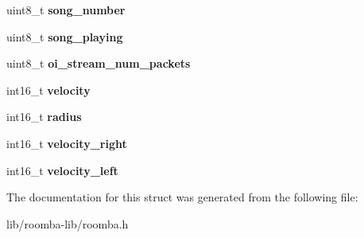 \begin{DoxyCompactItemize}
\item 
\hypertarget{group__roomba-lib_ga4555c6fbef8603704920f166b769c336}{}uint8\+\_\+t {\bfseries song\+\_\+number}\label{group__roomba-lib_ga4555c6fbef8603704920f166b769c336}

\item 
\hypertarget{group__roomba-lib_gad0ca49b2f11f06d401f9487315d87f3c}{}uint8\+\_\+t {\bfseries song\+\_\+playing}\label{group__roomba-lib_gad0ca49b2f11f06d401f9487315d87f3c}

\item 
\hypertarget{group__roomba-lib_gac5aa7f5bbd15fc5d47626edba0c28663}{}uint8\+\_\+t {\bfseries oi\+\_\+stream\+\_\+num\+\_\+packets}\label{group__roomba-lib_gac5aa7f5bbd15fc5d47626edba0c28663}

\item 
\hypertarget{group__roomba-lib_ga5a709be41fa0b2c21b9e680ac3576210}{}int16\+\_\+t {\bfseries velocity}\label{group__roomba-lib_ga5a709be41fa0b2c21b9e680ac3576210}

\item 
\hypertarget{group__roomba-lib_gaa74b14e5372c0a8c7bd5e4b1cf93ae77}{}int16\+\_\+t {\bfseries radius}\label{group__roomba-lib_gaa74b14e5372c0a8c7bd5e4b1cf93ae77}

\item 
\hypertarget{group__roomba-lib_ga10b7bddf0983644e3a9321a57a6284d9}{}int16\+\_\+t {\bfseries velocity\+\_\+right}\label{group__roomba-lib_ga10b7bddf0983644e3a9321a57a6284d9}

\item 
\hypertarget{group__roomba-lib_gae8cc0bf870e2a6dbfadb014db81cfbfe}{}int16\+\_\+t {\bfseries velocity\+\_\+left}\label{group__roomba-lib_gae8cc0bf870e2a6dbfadb014db81cfbfe}

\end{DoxyCompactItemize}


The documentation for this struct was generated from the following file\+:\begin{DoxyCompactItemize}
\item 
lib/roomba-\/lib/roomba.\+h\end{DoxyCompactItemize}
